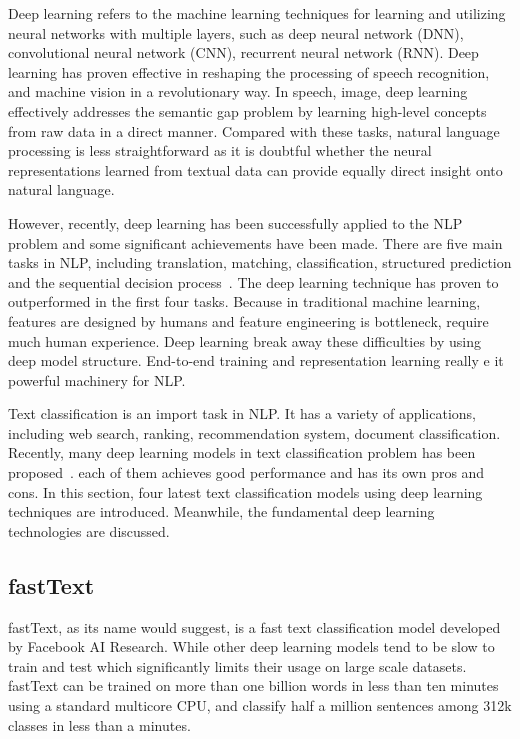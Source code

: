 Deep learning refers to the machine learning techniques for learning and utilizing neural networks with multiple layers, such as deep neural network (DNN), convolutional neural network (CNN), recurrent neural network (RNN). Deep learning has proven effective in reshaping the processing of speech recognition, and machine vision in a revolutionary way. In speech, image, deep learning effectively addresses the semantic gap problem by learning high-level concepts from raw data in a direct manner. Compared with these tasks, natural language processing is less straightforward as it is doubtful whether the neural representations learned from textual data can provide equally direct insight onto natural language. 

However, recently, deep learning has been successfully applied to the NLP problem and some significant achievements have been made. There are five main tasks in NLP, including translation, matching, classification, structured prediction and the sequential decision process~\cite{Li2017}. The deep learning technique has proven to outperformed in the first four tasks. Because in traditional machine learning, features are designed by humans and feature engineering is bottleneck, require much human experience. Deep learning break away these difficulties by using deep model structure. End-to-end training and representation learning really e it powerful machinery for NLP.

Text classification is an import task in NLP. It has a variety of applications, including web search, ranking, recommendation system, document classification. Recently, many deep learning models in text classification problem has been proposed~\cite{Joulin2016}\cite{zhang2015character}. each of them achieves good performance and has its own pros and cons. In this section, four latest text classification models using deep learning techniques are introduced. Meanwhile, the fundamental deep learning technologies are discussed. 


\subsection{fastText}

fastText, as its name would suggest, is a fast text classification model developed by Facebook AI Research. While other deep learning models tend to be slow to train and test which significantly limits their usage on large scale datasets. fastText can be trained on more than one billion words in less than ten minutes using a standard multicore CPU, and classify half a million sentences among 312k classes in less than a minutes.

